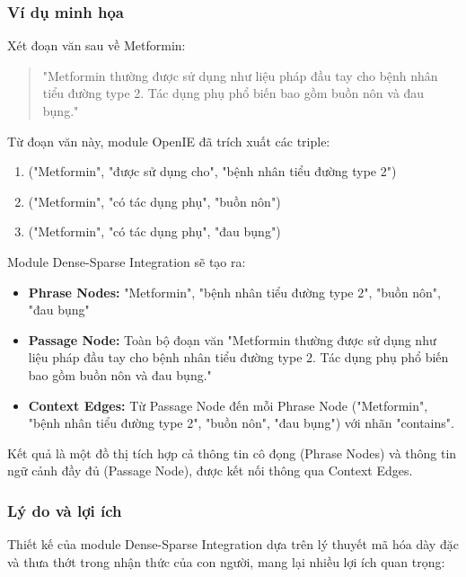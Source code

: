 \subsubsection{Ví dụ minh họa}
Xét đoạn văn sau về Metformin:

\begin{quote}
"Metformin thường được sử dụng như liệu pháp đầu tay cho bệnh nhân tiểu đường type 2. Tác dụng phụ phổ biến bao gồm buồn nôn và đau bụng."
\end{quote}

Từ đoạn văn này, module OpenIE đã trích xuất các triple:
\begin{enumerate}
    \item ("Metformin", "được sử dụng cho", "bệnh nhân tiểu đường type 2")
    \item ("Metformin", "có tác dụng phụ", "buồn nôn")
    \item ("Metformin", "có tác dụng phụ", "đau bụng")
\end{enumerate}

Module Dense-Sparse Integration sẽ tạo ra:

\begin{itemize}
    \item \textbf{Phrase Nodes:} "Metformin", "bệnh nhân tiểu đường type 2", "buồn nôn", "đau bụng"
    
    \item \textbf{Passage Node:} Toàn bộ đoạn văn "Metformin thường được sử dụng như liệu pháp đầu tay cho bệnh nhân tiểu đường type 2. Tác dụng phụ phổ biến bao gồm buồn nôn và đau bụng."
    
    \item \textbf{Context Edges:} Từ Passage Node đến mỗi Phrase Node ("Metformin", "bệnh nhân tiểu đường type 2", "buồn nôn", "đau bụng") với nhãn "contains".
\end{itemize}

Kết quả là một đồ thị tích hợp cả thông tin cô đọng (Phrase Nodes) và thông tin ngữ cảnh đầy đủ (Passage Node), được kết nối thông qua Context Edges.

\subsubsection{Lý do và lợi ích}
Thiết kế của module Dense-Sparse Integration dựa trên lý thuyết mã hóa dày đặc và thưa thớt trong nhận thức của con người, mang lại nhiều lợi ích quan trọng:

